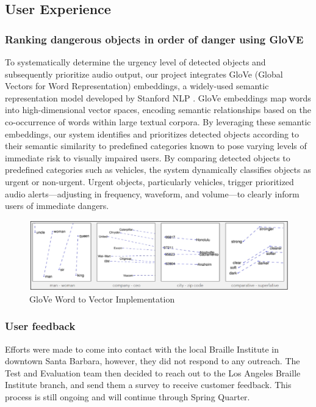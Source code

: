\documentclass[12pt,a4paper]{article}
\begin{document}
\newpage
\subsection{User Experience}
\subsubsection{Ranking dangerous objects in order of danger using GloVE}
To systematically determine the urgency level of detected objects and subsequently prioritize audio output, our project integrates GloVe (Global Vectors for Word Representation) embeddings, a widely-used semantic representation model developed by Stanford NLP \cite{pennington_glove}. GloVe embeddings map words into high-dimensional vector spaces, encoding semantic relationships based on the co-occurrence of words within large textual corpora. By leveraging these semantic embeddings, our system identifies and prioritizes detected objects according to their semantic similarity to predefined categories known to pose varying levels of immediate risk to visually impaired users. By comparing detected objects to predefined categories such as vehicles, the system dynamically classifies objects as urgent or non-urgent. Urgent objects, particularly vehicles, trigger prioritized audio alerts—adjusting in frequency, waveform, and volume—to clearly inform users of immediate dangers.

\begin{figure}[ht!]
    \center
    \includegraphics[width=1\linewidth]{glove.png}
    \caption{GloVe Word to Vector Implementation}
    \label{glove}
  \end{figure}
\subsubsection{User feedback}
Efforts were made to come into contact with the local Braille Institute in downtown Santa Barbara, however, they did not respond to any outreach. The Test and Evaluation team then decided to reach out to the Los Angeles Braille Institute branch, and send them a survey to receive customer feedback. This process is still ongoing and will continue through Spring Quarter. 
\end{document}
